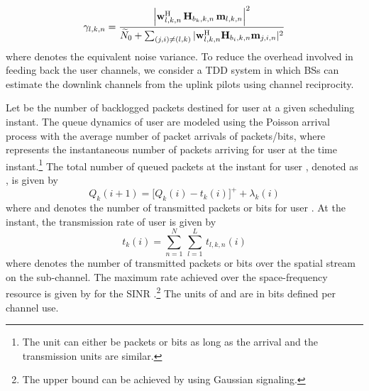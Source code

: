 \begin{equation}\label{eq:SINR}
\gamma_{l,k,n} = \dfrac{\left |\mvec{w}{l,k,n}^\herm \, \mvec{H}{b_k,k,n} \, \mvec{m}{l,k,n} \right |^2}{\enoise + \sum_{(j,i) \neq (l,k)} |\mvec{w}{l,k,n}^\herm \mvec{H}{b_i,k,n} \mvec{m}{j,i,n} |^2}
\end{equation}
where  denotes the equivalent noise variance. To reduce the overhead involved in feeding back the user channels, we consider a \ac{TDD} system in which \acp{BS} can estimate the downlink channels from the uplink pilots using channel reciprocity.

Let  be the number of backlogged packets destined for user  at a given scheduling instant. The queue dynamics of user  are modeled using the Poisson arrival process with the average number of packet arrivals of  packets/bits, where  represents the instantaneous number of packets arriving for user  at the  time instant.\footnote{The unit can either be packets or bits as long as the arrival and the transmission units are similar.} The total number of queued packets at the  instant for user , denoted as , is given by
\begin{equation}
Q_k(i+1) = \Big [ Q_k(i) - t_k(i) \Big ]^+ + \lambda_k(i)
\label{eqn-2a}
\end{equation}
where  and  denotes the number of transmitted packets or bits for user . At the  instant, the transmission rate of user  is given by
\begin{equation}
t_k(i) = \sum_{n = 1}^N \, \sum_{l = 1}^L \, t_{l,k,n}(i)
\end{equation}
where  denotes the number of transmitted packets or bits over the  spatial stream on the  sub-channel. The maximum rate achieved over the space-frequency resource  is given by  for the \ac{SINR} .\footnote{The upper bound can be achieved by using Gaussian signaling.} The units of  and  are in bits defined per channel use. 
